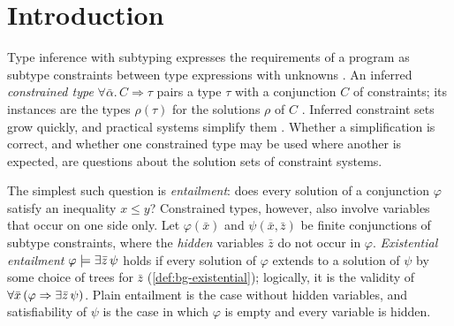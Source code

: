 
\providecommand{\parity}{\operatorname{par}}
\providecommand{\CondI}{\textup{(I0)}}
\providecommand{\CondU}{\textup{(U)}}
\providecommand{\CondII}{\textup{(II)}}

\section{Introduction}\label{sec:intro}

Type inference with subtyping expresses the requirements of a program as
subtype constraints between type expressions with unknowns
\citep{Mitchell91,FuhMishra90,AikenWimmers93,EifrigSmithTrifonov95,Pottier98}.
An inferred \emph{constrained type} $\forall\bar\alpha.\,C\Rightarrow\tau$
pairs a type $\tau$ with a conjunction $C$ of constraints; its instances are
the types $\rho(\tau)$ for the solutions $\rho$ of $C$
\citep{TrifonovSmith96}. Inferred constraint sets grow quickly, and practical
systems simplify them
\citep{Pottier96,Pottier01,TrifonovSmith96,FahndrichAiken96,AikenWimmersPalsberg99,FlanaganFelleisen99}.
Whether a simplification is correct, and whether one constrained type may be
used where another is expected, are questions about the solution sets of
constraint systems.

The simplest such question is \emph{entailment}: does every solution of a
conjunction $\varphi$ satisfy an inequality $x\le y$? Constrained types,
however, also involve variables that occur on one side only. Let
$\varphi(\bar x)$ and $\psi(\bar x,\bar z)$ be finite conjunctions of subtype
constraints, where the \emph{hidden} variables $\bar z$ do not occur in
$\varphi$. \emph{Existential entailment} $\varphi\models\exists\bar z\,\psi$ holds if
every solution of $\varphi$ extends to a solution of $\psi$ by some choice of
trees for $\bar z$ (\cref{def:bg-existential}); logically, it is the validity
of $\forall\bar x\,(\varphi\Rightarrow\exists\bar z\,\psi)$. Plain entailment is the
case without hidden variables, and satisfiability of $\psi$ is the case in
which $\varphi$ is empty and every variable is hidden.

